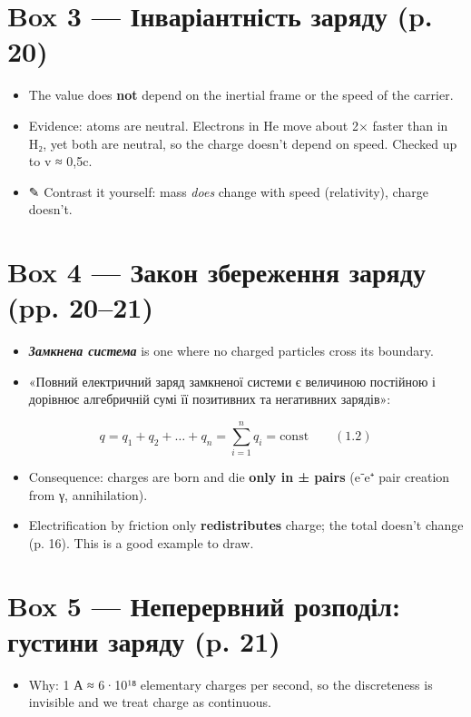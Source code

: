 \documentclass[11pt,a4paper,oneside]{book}
\newcommand{\pen}{{\sffamily\color{accent}✎}}
\begin{document}
\section*{Box 3 — Інваріантність заряду (p. 20)}

\begin{itemize}
\item The value does \textbf{not} depend on the inertial frame or the speed of the carrier.
\item Evidence: atoms are neutral. Electrons in He move about 2× faster than in H₂, yet both are neutral, so the charge doesn't depend on speed. Checked up to v ≈ 0,5c.
\item \pen{} Contrast it yourself: mass \textit{does} change with speed (relativity), charge doesn't.
\end{itemize}

\section*{Box 4 — Закон збереження заряду (pp. 20–21)}

\begin{itemize}
\item \textbf{\textit{Замкнена система}} is one where no charged particles cross its boundary.
\item «Повний електричний заряд замкненої системи є величиною постійною і дорівнює алгебричній сумі її позитивних та негативних зарядів»:
\end{itemize}

\[q = q_1 + q_2 + \ldots + q_n = \sum_{i=1}^{n} q_i = \text{const} \qquad (1.2)\]

\begin{itemize}
\item Consequence: charges are born and die \textbf{only in ± pairs} (e⁻e⁺ pair creation from γ, annihilation).
\item Electrification by friction only \textbf{redistributes} charge; the total doesn't change (p. 16). This is a good example to draw.
\end{itemize}

\section*{Box 5 — Неперервний розподіл: густини заряду (p. 21)}

\begin{itemize}
\item Why: 1 А ≈ 6·10¹⁸ elementary charges per second, so the discreteness is invisible and we treat charge as continuous.
\end{itemize}
\end{document}
